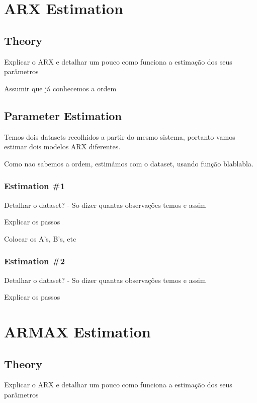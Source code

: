 \documentclass[12pt]{article}
\begin{document}
\section{ARX Estimation}
\label{arx_estimation}

\subsection{Theory}

Explicar o ARX e detalhar um pouco como funciona a estimação dos seus parâmetros

Assumir que já conhecemos a ordem

\subsection{Parameter Estimation}

Temos dois datasets recolhidos a partir do mesmo sistema, portanto vamos estimar dois modelos ARX diferentes.

Como nao sabemos a ordem, estimámos com o dataset, usando função blablabla.

\subsubsection{Estimation \#1}

Detalhar o dataset? - So dizer quantas observações temos e assim

Explicar os passos

Colocar os A's, B's, etc

\subsubsection{Estimation \#2}

Detalhar o dataset? - So dizer quantas observações temos e assim

Explicar os passos


\section{ARMAX Estimation}
\label{armax_estimation}

\subsection{Theory}

Explicar o ARX e detalhar um pouco como funciona a estimação dos seus parâmetros
\end{document}
